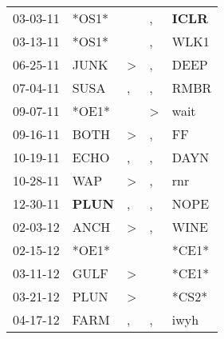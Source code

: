 \begin{supertabular}{p{0.07\textwidth}p{0.06\textwidth}p{0.02\textwidth}p{0.02\textwidth}p{0.06\textwidth}}
          03-03-11\textsuperscript{} &                            *OS1* &                  &                , &  \textbf{ICLR\textsuperscript{}} \\
          03-13-11\textsuperscript{} &                            *OS1* &                  &                , &           WLK1\textsuperscript{} \\
          06-25-11\textsuperscript{} &           JUNK\textsuperscript{} &     \textgreater &                , &           DEEP\textsuperscript{} \\
          07-04-11\textsuperscript{} &           SUSA\textsuperscript{} &                , &                , &           RMBR\textsuperscript{} \\
          09-07-11\textsuperscript{} &                            *OE1* &                  &     \textgreater &           wait\textsuperscript{} \\
          09-16-11\textsuperscript{} &           BOTH\textsuperscript{} &     \textgreater &                , &             FF\textsuperscript{} \\
          10-19-11\textsuperscript{} &           ECHO\textsuperscript{} &                , &                , &           DAYN\textsuperscript{} \\
          10-28-11\textsuperscript{} &            WAP\textsuperscript{} &     \textgreater &                , &            rnr\textsuperscript{} \\
          12-30-11\textsuperscript{} &  \textbf{PLUN\textsuperscript{}} &                , &                , &           NOPE\textsuperscript{} \\
          02-03-12\textsuperscript{} &           ANCH\textsuperscript{} &     \textgreater &                , &           WINE\textsuperscript{} \\
          02-15-12\textsuperscript{} &                            *OE1* &                  &                  &                            *CE1* \\
          03-11-12\textsuperscript{} &           GULF\textsuperscript{} &     \textgreater &                  &                            *CE1* \\
          03-21-12\textsuperscript{} &           PLUN\textsuperscript{} &     \textgreater &                  &                            *CS2* \\
          04-17-12\textsuperscript{} &           FARM\textsuperscript{} &                , &                , &           iwyh\textsuperscript{} \\

\end{supertabular}
